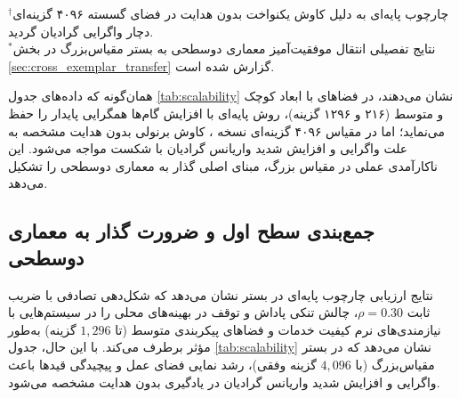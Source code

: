 \documentclass[oneside,openany,phd]{TMU-Thesis}
\begin{document}
\begin{table}[htbp]
\centering
\caption{تحلیل مقیاس‌پذیری و مقایسه عملکرد در مقیاس‌های مختلف شبکه }
\label{tab:scalability}
\smallskip
\parbox{0.95\linewidth}{\scriptsize $^\dagger$چارچوب پایه‌ای  به دلیل کاوش یکنواخت بدون هدایت در فضای گسسته ۴۰۹۶ گزینه‌ای دچار واگرایی گرادیان گردید.\\ $^*$نتایج تفصیلی انتقال موفقیت‌آمیز معماری دوسطحی \rsdrlplus به بستر مقیاس‌بزرگ  در بخش \ref{sec:cross_exemplar_transfer} گزارش شده است.}
\end{table}

همان‌گونه که داده‌های جدول \ref{tab:scalability} نشان می‌دهند، در فضاهای با ابعاد کوچک و متوسط (۲۱۶ و ۱۲۹۶ گزینه)، روش پایه‌ای با افزایش گام‌ها همگرایی پایدار را حفظ می‌نماید؛ اما در مقیاس ۴۰۹۶ گزینه‌ای نسخه ، کاوش برنولی بدون هدایت مشخصه به علت واگرایی و افزایش شدید واریانس گرادیان با شکست مواجه می‌شود. این ناکارآمدی عملی در مقیاس بزرگ، مبنای اصلی گذار به معماری دوسطحی \rsdrlplus را تشکیل می‌دهد.

\subsection{جمع‌بندی سطح اول و ضرورت گذار به معماری دوسطحی \texorpdfstring{\rsdrlplus}{RS-DRL+}}
\label{subsec:transition_to_rsdrlplus}

نتایج ارزیابی چارچوب پایه‌ای  در بستر  نشان می‌دهد که شکل‌دهی تصادفی با ضریب ثابت $\rho = 0.30$، چالش تنکی پاداش و توقف در بهینه‌های محلی را در سیستم‌هایی با نیازمندی‌های نرم کیفیت خدمات و فضاهای پیکربندی متوسط (تا $1{,}296$ گزینه) به‌طور مؤثر برطرف می‌کند. با این حال، جدول \ref{tab:scalability} نشان می‌دهد که در بستر مقیاس‌بزرگ  (با $4{,}096$ گزینه وفقی)، رشد نمایی فضای عمل و پیچیدگی قیدها باعث واگرایی و افزایش شدید واریانس گرادیان در یادگیری بدون هدایت مشخصه می‌شود.
\end{document}
